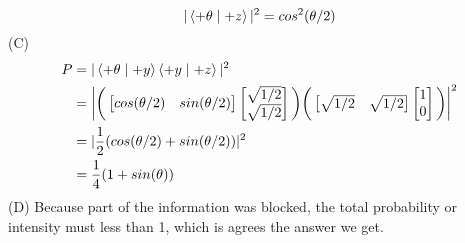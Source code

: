 \documentclass{article}
\providecommand{\bigp}[1]{\bigg( #1 \bigg)}
\providecommand{\Matrix}[1] {\begin{bmatrix} #1 \end{bmatrix}}
\theoremstyle{definition}
\theoremstyle{plain}
\begin{document}
\begin {enumerate}[itemindent=30pt,label=\bf Exercise {\arabic*}:]
$$|\Braket{+\theta \mid +z}|^{2} = cos^{2} (\theta/2)$$ 
\subitem (C)
\begin{align*}
	P &= |\Braket{+\theta \mid +y} \Braket{+y \mid +z}|^{2}\\
	&=\bigg|\bigp{\Matrix{cos(\theta / 2) & sin(\theta / 2)} \Matrix{\sqrt{1/2} \\ \sqrt{1/2}}} \bigp{\Matrix{\sqrt{1/2} & \sqrt{1/2}} \Matrix{ 1 \\ 0}}\bigg|^{2}\\
	&=|\dfrac{1}{2} (cos(\theta/2) + sin(\theta/2))|^{2}\\
	&=\dfrac{1}{4} (1 + sin(\theta))
\end{align*}
\subitem (D) Because part of the information was blocked, the total probability or intensity must less than 1, which is agrees the answer we get.


\end{enumerate}
\end{document}
